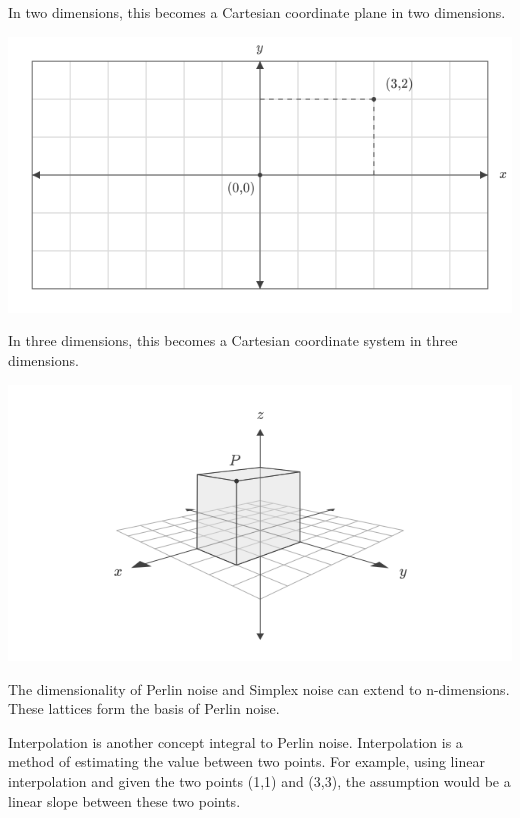 \documentclass[10pt]{report}
\begin{document}
		In two dimensions, this becomes a Cartesian coordinate plane in two dimensions.
	
		\begin{minipage}{\textwidth}
			\centering
			\includegraphics[scale=.35]{2d}
			\label{fig:2d}
		\end{minipage}
	
		In three dimensions, this becomes a Cartesian coordinate system in three dimensions.
		
		\begin{minipage}{\textwidth}
			\centering
			\includegraphics[scale=.5]{3d}
			\label{fig:3d}
		\end{minipage}
	
		The dimensionality of Perlin noise and Simplex noise can extend to n-dimensions. These lattices form the basis of Perlin noise.
		
		Interpolation is another concept integral to Perlin noise. Interpolation is a method of estimating the value between two points. For example, using linear interpolation and given the two points (1,1) and (3,3), the assumption would be a linear slope between these two points. 
		
\end{document}
